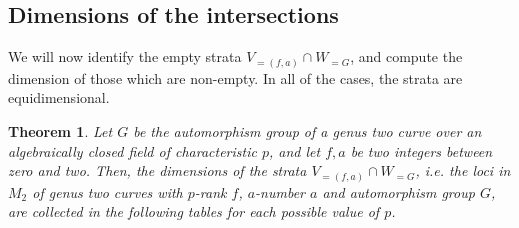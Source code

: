 \documentclass{amsart}
\numberwithin{equation}{section}
\newtheorem{theorem}{Theorem}[section]  %
\theoremstyle{definition}
\theoremstyle{remark}
\begin{document}
\subsection{Dimensions of the intersections}
We will now identify the empty strata $ V_{=(f,a)} \cap W_{= G}$, and compute the dimension of those which are non-empty. In all of the cases, the strata are equidimensional. 

\begin{theorem} \label{intersection_theorem}
Let $G$ be the automorphism group of a genus two curve over an algebraically closed field of characteristic $p$, and let $f, a$ be two integers between zero and two. Then, the dimensions of the strata $V_{=(f,a)}\cap W_{= G}$, i.e. the loci in $M_2$ of  genus two curves with $p$-rank $f$, $a$-number $a$ and automorphism group $G$, are collected in the following tables for each possible value of $p$.\\


\end{theorem}
\end{document}
